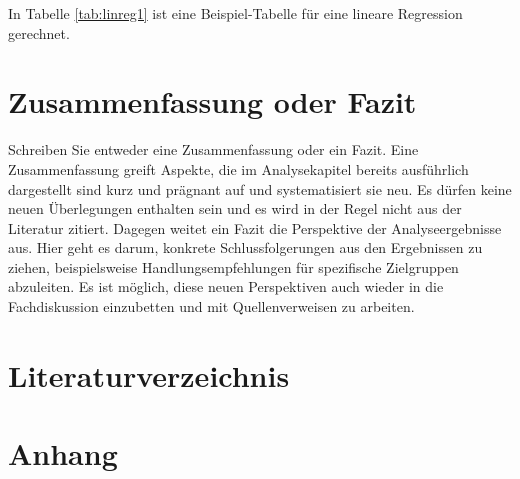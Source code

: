 \documentclass[
  12pt,
]{article}
\newlength{\cslhangindent}
\newlength{\cslentryspacingunit} %
\newenvironment{CSLReferences}[2] %
 {%
  \setlength{\parindent}{0pt}
  \ifodd #1
  \let\oldpar\par
  \def\par{\hangindent=\cslhangindent\oldpar}
  \fi
  \setlength{\parskip}{#2\cslentryspacingunit}
 }%
 {}
\begin{document}
In Tabelle \ref{tab:linreg1} ist eine Beispiel-Tabelle für eine lineare
Regression gerechnet.

\hypertarget{zusammenfassung-oder-fazit}{%
\section{Zusammenfassung oder Fazit}\label{zusammenfassung-oder-fazit}}

Schreiben Sie entweder eine Zusammenfassung oder ein Fazit. Eine
Zusammenfassung greift Aspekte, die im Analysekapitel bereits
ausführlich dargestellt sind kurz und prägnant auf und systematisiert
sie neu. Es dürfen keine neuen Überlegungen enthalten sein und es wird
in der Regel nicht aus der Literatur zitiert. Dagegen weitet ein Fazit
die Perspektive der Analyseergebnisse aus. Hier geht es darum, konkrete
Schlussfolgerungen aus den Ergebnissen zu ziehen, beispielsweise
Handlungsempfehlungen für spezifische Zielgruppen abzuleiten. Es ist
möglich, diese neuen Perspektiven auch wieder in die Fachdiskussion
einzubetten und mit Quellenverweisen zu arbeiten.

\pagebreak

\hypertarget{literaturverzeichnis}{%
\section{Literaturverzeichnis}\label{literaturverzeichnis}}

\hypertarget{refs}{}
\begin{CSLReferences}{0}{0}
\end{CSLReferences}

\pagebreak
{}

\hypertarget{anhang}{%
\section*{Anhang}\label{anhang}}

\thispagestyle{empty}
\end{document}
